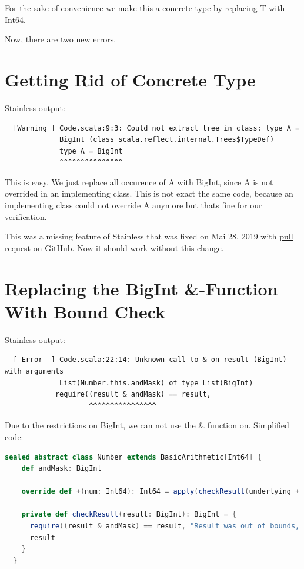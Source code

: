 For the sake of convenience we make this a concrete type by replacing T with Int64.

Now, there are two new errors.


\section{Getting Rid of Concrete Type}

Stainless output:
{\footnotesize\begin{verbatim}
  [Warning ] Code.scala:9:3: Could not extract tree in class: type A =
             BigInt (class scala.reflect.internal.Trees$TypeDef)
             type A = BigInt
             ^^^^^^^^^^^^^^^
\end{verbatim}}

This is easy.
We just replace all occurence of A with BigInt, since A is not overrided in an implementing class.
This is not exact the same code, because an implementing class could not override A anymore but thats fine for our verification.

This was a missing feature of Stainless that was fixed on Mai 28, 2019 with \href{https://github.com/epfl-lara/stainless/pull/470}{pull request } on GitHub.
Now it should work without this change.


\section{Replacing the BigInt \&-Function With Bound Check}
\label{sec:bound_check}

Stainless output:
{\footnotesize\begin{verbatim}
  [ Error  ] Code.scala:22:14: Unknown call to & on result (BigInt) with arguments
             List(Number.this.andMask) of type List(BigInt)
            require((result & andMask) == result,
                    ^^^^^^^^^^^^^^^^
\end{verbatim}}

Due to the restrictions on BigInt, we can not use the \& function on.
Simplified code:
\begin{lstlisting}[language=scala]
  sealed abstract class Number extends BasicArithmetic[Int64] {
    def andMask: BigInt

    override def +(num: Int64): Int64 = apply(checkResult(underlying + num.underlying))

    private def checkResult(result: BigInt): BigInt = {
      require((result & andMask) == result, "Result was out of bounds, got: " + result)
      result
    }
  }
\end{lstlisting}

